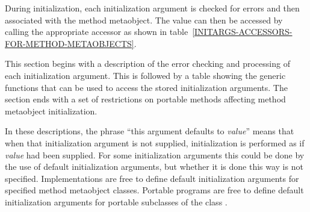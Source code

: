 During initialization, each initialization argument is checked for errors and
then associated with the method metaobject. The value can then be accessed by
calling the appropriate accessor as shown in
table~\ref{INITARGS-ACCESSORS-FOR-METHOD-METAOBJECTS}.

This section begins with a description of the error checking and processing of
each initialization argument. This is followed by a table showing the generic
functions that can be used to access the stored initialization arguments. The
section ends with a set of restrictions on portable methods affecting method
metaobject initialization.

In these descriptions, the phrase ``this argument defaults to \emph{value}''
means that when that initialization argument is not supplied, initialization is
performed as if \emph{value} had been supplied. For some initialization
arguments this could be done by the use of default initialization arguments, but
whether it is done this way is not specified. Implementations are free to define
default initialization arguments for specified method metaobject
classes. Portable programs are free to define default initialization arguments
for portable subclasses of the class .


